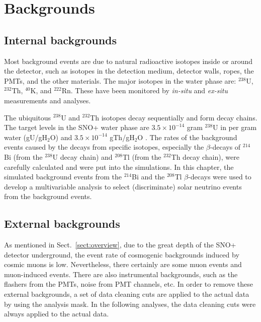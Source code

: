 \section{Backgrounds}

\subsection{Internal backgrounds}

Most background events are due to natural radioactive isotopes inside or around the detector, such as isotopes in the detection medium, detector walls, ropes, the PMTs, and the other materials. The major isotopes in the water phase are: $^{238}$U, $^{232}$Th, $^{40}$K, and $^{222}$Rn. These have been monitored by \emph{in-situ} and \emph{ex-situ} measurements and analyses. 

The ubiquitous $^{238}$U and $^{232}$Th isotopes decay sequentially and form decay chains. 
The target levels in the SNO+ water phase are $3.5\times 10^{-14}$ gram $^{238}$U in per gram water (gU/gH$_2$O) and $3.5\times 10^{-14}$ gTh/gH$_2$O \cite{waterunidoc}. The rates of the background events caused by the decays from specific isotopes, especially the $\beta$-decays of $^{214}$Bi (from the $^{238}$U decay chain) and $^{208}$Tl (from the $^{232}$Th decay chain), were carefully calculated and were put into the simulations. In this chapter, the simulated background events from the $^{214}$Bi and the $^{208}$Tl $\beta$-decays were used to develop a multivariable analysis to select (discriminate) solar neutrino events from the background events.

\subsection{External backgrounds}

As mentioned in Sect.~\ref{sect:overview}, due to the great depth of the SNO+ detector underground, the event rate of cosmogenic backgrounds induced by cosmic muons is low. Nevertheless, there certainly are some muon events and muon-induced events. There are also instrumental backgrounds, such as the flashers from the PMTs, noise from PMT channels, etc. In order to remove these external backgrounds, a set of data cleaning cuts are applied to the actual data by using the analysis mask. In the following analyses, the data cleaning cuts were always applied to the actual data.

